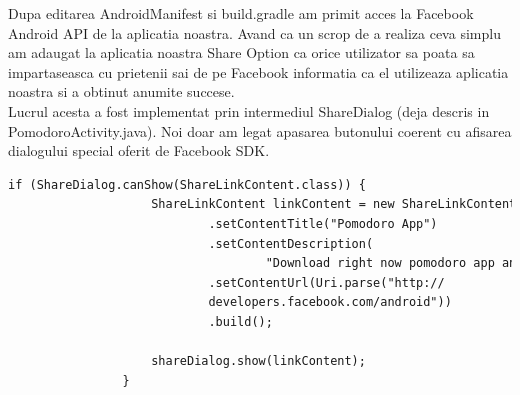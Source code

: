 \documentclass[12pt]{article}
\begin{document}
Dupa editarea AndroidManifest si build.gradle am primit acces la Facebook Android API de la aplicatia noastra. Avand ca un scrop de a realiza ceva simplu am adaugat la aplicatia noastra Share Option ca orice utilizator sa poata sa impartaseasca cu prietenii sai de pe Facebook informatia ca el utilizeaza aplicatia noastra si a obtinut anumite succese.
\\ Lucrul acesta a fost implementat prin intermediul ShareDialog (deja descris in PomodoroActivity.java). Noi doar am legat apasarea butonului coerent cu afisarea dialogului special oferit de Facebook SDK.
\begin{lstlisting}[language=html, caption={Afisarea Facebook Share Dialog}, label=list2]
if (ShareDialog.canShow(ShareLinkContent.class)) {
                    ShareLinkContent linkContent = new ShareLinkContent.Builder()
                            .setContentTitle("Pomodoro App")
                            .setContentDescription(
                                    "Download right now pomodoro app and change your life!")
                            .setContentUrl(Uri.parse("http://
                            developers.facebook.com/android"))
                            .build();

                    shareDialog.show(linkContent);
                }\end{lstlisting}
\end{document}
